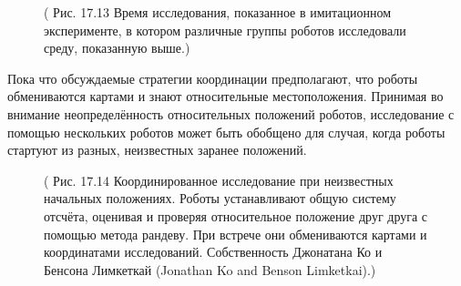 \documentclass[10pt,a4paper]{article}
\begin{document}
\begin{figure}[H]
	\caption{ ( Рис. 17.13 Время исследования, показанное в имитационном эксперименте, в котором различные группы роботов исследовали среду, показанную выше.) }
	\label{fig:1713orig}
\end{figure}

Пока что обсуждаемые стратегии координации предполагают, что роботы обмениваются картами и знают относительные местоположения. Принимая во внимание неопределённость относительных положений роботов, исследование с помощью нескольких роботов может быть обобщено для случая, когда роботы стартуют из разных, неизвестных заранее положений.

\begin{figure}[H]
	\caption{ ( Рис. 17.14 Координированное исследование при неизвестных начальных положениях. Роботы устанавливают общую систему отсчёта, оценивая и проверяя относительное положение друг друга с помощью метода рандеву. При встрече они обмениваются картами и координатами исследований. Собственность Джонатана Ко и Бенсона Лимкеткай (Jonathan Ko and Benson Limketkai).) }
	\label{fig:1714orig}
\end{figure}
\end{document}
